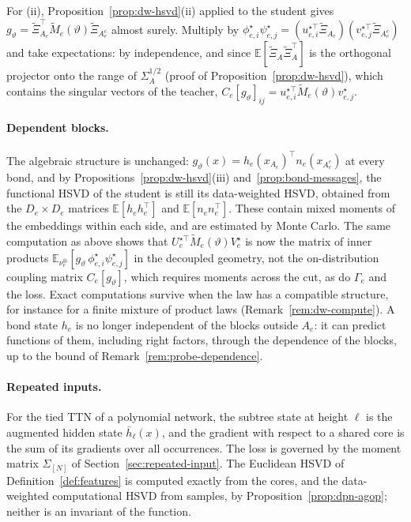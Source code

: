 \documentclass[11pt]{article}
\newcommand{\E}{\mathbb{E}}
\newcommand{\hb}{\bar{h}}
\theoremstyle{definition}
\numberwithin{equation}{section}
\begin{document}
For (ii), Proposition~\ref{prop:dw-hsvd}(ii) applied to the student gives $g_\vartheta=\tilde\Xi_{A_e}^\top\tilde M_e(\vartheta)\tilde\Xi_{A_e^c}$ almost surely. Multiply by $\phi^\star_{e,i}\psi^\star_{e,j}=(u^{\star\top}_{e,i}\tilde\Xi_{A_e})(v^{\star\top}_{e,j}\tilde\Xi_{A_e^c})$ and take expectations: by independence, and since $\E[\tilde\Xi_A\tilde\Xi_A^\top]$ is the orthogonal projector onto the range of $\Sigma_A^{1/2}$ (proof of Proposition~\ref{prop:dw-hsvd}), which contains the singular vectors of the teacher, $C_e[g_\vartheta]_{ij}=u^{\star\top}_{e,i}\tilde M_e(\vartheta)v^\star_{e,j}$.

\paragraph{Dependent blocks.}
The algebraic structure is unchanged: $g_\vartheta(x)=h_e(x_{A_e})^\top n_e(x_{A_e^c})$ at every bond, and by Propositions~\ref{prop:dw-hsvd}(iii) and~\ref{prop:bond-messages}, the functional HSVD of the student is still its data-weighted HSVD, obtained from the $D_e\times D_e$ matrices $\E[h_eh_e^\top]$ and $\E[n_en_e^\top]$. These contain mixed moments of the embeddings within each side, and are estimated by Monte Carlo. The same computation as above shows that $U^{\star\top}_e\tilde M_e(\vartheta)V^\star_e$ is now the matrix of inner products $\E_{\nu^\otimes_e}[g_\vartheta\,\phi^\star_{e,i}\psi^\star_{e,j}]$ in the decoupled geometry, not the on-distribution coupling matrix $C_e[g_\vartheta]$, which requires moments across the cut, as do $\Gamma_e$ and the loss. Exact computations survive when the law has a compatible structure, for instance for a finite mixture of product laws (Remark~\ref{rem:dw-compute}). A bond state $h_e$ is no longer independent of the blocks outside $A_e$: it can predict functions of them, including right factors, through the dependence of the blocks, up to the bound of Remark~\ref{rem:probe-dependence}.

\paragraph{Repeated inputs.}
For the tied TTN of a polynomial network, the subtree state at height $\ell$ is the augmented hidden state $\hb_\ell(x)$, and the gradient with respect to a shared core is the sum of its gradients over all occurrences. The loss is governed by the moment matrix $\Sigma_{[N]}$ of Section~\ref{sec:repeated-input}. The Euclidean HSVD of Definition~\ref{def:features} is computed exactly from the cores, and the data-weighted computational HSVD from samples, by Proposition~\ref{prop:dpn-agop}; neither is an invariant of the function.
\end{document}
